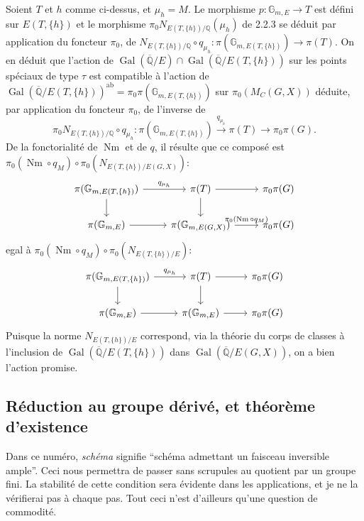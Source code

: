 \documentclass[12pt,a4paper]{article}
\theoremstyle{plain}
\theoremstyle{definition}
\theoremstyle{remark}
\DeclareMathOperator{\Gal}{Gal}
\DeclareMathOperator{\Nm}{Nm}
\newcommand{\QQ}{\mathbb{Q}}
\newcommand{\Gm}{\mathbb{G}}
\begin{document}
Soient $T$ et $h$ comme ci-dessus, et $\mu_h = M$. Le morphisme $p:\Gm_{m,E} \to T$ est d\'efini sur $E(T,\{h\})$ et le morphisme $\pi_0 N_{E(T,\{h\})/\QQ}(\mu_h)$ de 2.2.3 se d\'eduit par application du foncteur $\pi_0$, de $N_{E(T,\{h\})/\QQ} \circ q_{\mu_h}: \pi(\Gm_{m,E(T,\{h\})}) \to \pi(T)$. On en d\'eduit que l'action de $\Gal(\overline{\QQ}/E) \cap \Gal(\overline{\QQ}/E(T,\{h\}))$ sur les points sp\'eciaux de type $\tau$ est compatible \`a l'action de $\Gal(\overline{\QQ}/E(T,\{h\}))^{\text{ab}} = \pi_0\pi(\Gm_{m,E(T,\{h\})})$ sur $\pi_0(M_C(G,X))$ d\'eduite, par application du foncteur $\pi_0$, de l'inverse de
\[
\pi_0 N_{E(T,\{h\})/\QQ} \circ q_{\mu_h}: \pi(\Gm_{m,E(T,\{h\})}) \xrightarrow{q_{\mu_h}} \pi(T) \to \pi_0\pi(G).
\]
De la fonctorialit\'e de $\Nm$ et de $q$, il r\'esulte que ce compos\'e est $\pi_0(\Nm \circ q_M) \circ \pi_0(N_{E(T,\{h\})/E(G,X)})$:
\[
\begin{tikzcd}
\pi(\Gm_{m,E(T,\{h\})}) \arrow[r, "q_{\mu_h}"] \arrow[d] & \pi(T) \arrow[r] \arrow[d] & \pi_0\pi(G) \\
\pi(\Gm_{m,E}) \arrow[r] & \pi(\Gm_{m,E(G,X)}) \arrow[r, "\pi_0(\Nm \circ q_M)"] & \pi_0\pi(G)
\end{tikzcd}
\]
egal \`a $\pi_0(\Nm \circ q_M) \circ \pi_0(N_{E(T,\{h\})/E})$:
\[
\begin{tikzcd}
\pi(\Gm_{m,E(T,\{h\})}) \arrow[r, "q_{\mu_h}"] \arrow[d] & \pi(T) \arrow[r] \arrow[d] & \pi_0\pi(G) \\
\pi(\Gm_{m,E}) \arrow[r] & \pi(\Gm_{m,E}) \arrow[r] & \pi_0\pi(G)
\end{tikzcd}
\]
Puisque la norme $N_{E(T,\{h\})/E}$ correspond, via la th\'eorie du corps de classes \`a l'inclusion de $\Gal(\overline{\QQ}/E(T,\{h\}))$ dans $\Gal(\overline{\QQ}/E(G,X))$, on a bien l'action promise.

\subsection{R\'eduction au groupe d\'eriv\'e, et th\'eor\`eme d'existence}

Dans ce num\'ero, \textit{sch\'ema} signifie ``sch\'ema admettant un faisceau inversible ample''. Ceci nous permettra de passer sans scrupules au quotient par un groupe fini. La stabilit\'e de cette condition sera \'evidente dans les applications, et je ne la v\'erifierai pas \`a chaque pas. Tout ceci n'est d'ailleurs qu'une question de commodit\'e.

\subsubsection{}
\end{document}
